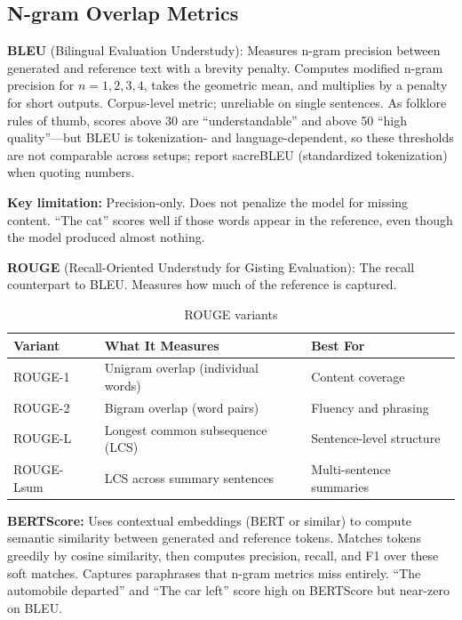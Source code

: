 \subsection{N-gram Overlap Metrics}

\textbf{BLEU} (Bilingual Evaluation Understudy): Measures n-gram precision between generated and reference text with a brevity penalty. Computes modified n-gram precision for $n = 1, 2, 3, 4$, takes the geometric mean, and multiplies by a penalty for short outputs. Corpus-level metric; unreliable on single sentences. As folklore rules of thumb, scores above 30 are ``understandable'' and above 50 ``high quality''---but BLEU is tokenization- and language-dependent, so these thresholds are not comparable across setups; report sacreBLEU (standardized tokenization) when quoting numbers.

\textbf{Key limitation:} Precision-only. Does not penalize the model for missing content. ``The cat'' scores well if those words appear in the reference, even though the model produced almost nothing.

\textbf{ROUGE} (Recall-Oriented Understudy for Gisting Evaluation): The recall counterpart to BLEU. Measures how much of the reference is captured.

\begin{table}[H]
\centering
\caption{ROUGE variants}
\begin{tabularx}{\textwidth}{lXX}
\toprule
\textbf{Variant} & \textbf{What It Measures} & \textbf{Best For} \\
\midrule
ROUGE-1 & Unigram overlap (individual words) & Content coverage \\
ROUGE-2 & Bigram overlap (word pairs) & Fluency and phrasing \\
ROUGE-L & Longest common subsequence (LCS) & Sentence-level structure \\
ROUGE-Lsum & LCS across summary sentences & Multi-sentence summaries \\
\bottomrule
\end{tabularx}
\end{table}

\textbf{BERTScore:} Uses contextual embeddings (BERT or similar) to compute semantic similarity between generated and reference tokens. Matches tokens greedily by cosine similarity, then computes precision, recall, and F1 over these soft matches. Captures paraphrases that n-gram metrics miss entirely. ``The automobile departed'' and ``The car left'' score high on BERTScore but near-zero on BLEU.

